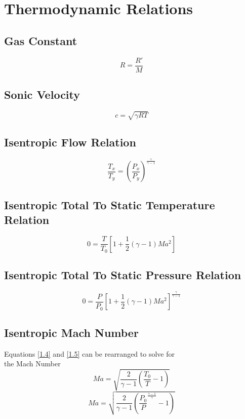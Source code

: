 \documentclass{article}
\begin{document}
\pagebreak

\section{Thermodynamic Relations\hfil\cite{RPE}}

\subsection{Gas Constant}
\begin{equation} \tag{1.1} \label{1.1}
    R = \frac{R'}{M}
\end{equation}

\subsection{Sonic Velocity}
\begin{equation} \tag{1.2} \label{1.2}
    c = \sqrt{\gamma R T}
\end{equation}

\subsection{Isentropic Flow Relation}
\begin{equation} \tag{1.3} \label{1.3}
    \frac{T_x}{T_y} = \left(\frac{P_x}{P_y}\right) ^ {\frac{\gamma}{\gamma - 1}}
\end{equation}

\subsection{Isentropic Total To Static Temperature Relation}
\begin{equation} \tag{1.4} \label{1.4}
    0 = \frac{T}{T_0} \left[1 + \frac{1}{2} \left(\gamma - 1\right) Ma ^ 2\right]
\end{equation}

\subsection{Isentropic Total To Static Pressure Relation}
\begin{equation} \tag{1.5} \label{1.5}
    0 = \frac{P}{P_0} \left[1 + \frac{1}{2} \left(\gamma - 1\right) Ma ^ 2\right] ^ {\frac{\gamma}{\gamma - 1}}
\end{equation}

\subsection{Isentropic Mach Number}
Equations \eqref{1.4} and \eqref{1.5} can be rearranged to solve for \\
the Mach Number
\begin{equation} \tag{1.6a} \label{1.6a}
    Ma = \sqrt{\frac{2}{\gamma - 1} \left(\frac{T_0}{T} - 1\right)}
\end{equation}
\begin{equation} \tag{1.6b} \label{1.6b}
    Ma = \sqrt{\frac{2}{\gamma - 1} \left(\frac{P_0}{P} ^ {\frac{\gamma - 1}{\gamma}} - 1\right)}
\end{equation}
\end{document}
